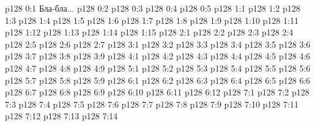 \author{Midwayer Commission}
\vs p128 0:1  Бла-бла...
\vs p128 0:2 
\vs p128 0:3 
\vs p128 0:4 
\vs p128 0:5 \pc 
{}
\vs p128 1:1 
\vs p128 1:2 
\vs p128 1:3 
\vs p128 1:4 
\vs p128 1:5 \pc 
\vs p128 1:6 \pc 
\vs p128 1:7 
\vs p128 1:8 
\vs p128 1:9 
\vs p128 1:10 
\vs p128 1:11 \pc 
\vs p128 1:12 
\vs p128 1:13 
\vs p128 1:14 \pc 
\vs p128 1:15 
\vs p128 2:1 
\vs p128 2:2 
\vs p128 2:3 
\vs p128 2:4 \pc 
\vs p128 2:5 \pc 
\vs p128 2:6 
\vs p128 2:7 
\vs p128 3:1 
\vs p128 3:2 
\vs p128 3:3 
\vs p128 3:4 
\vs p128 3:5 
\vs p128 3:6 
\vs p128 3:7 \pc 
\vs p128 3:8 
\vs p128 3:9 \pc 
{}
\vs p128 4:1 
\vs p128 4:2 
\vs p128 4:3 
\vs p128 4:4 
\vs p128 4:5 \pc 
\vs p128 4:6 
\vs p128 4:7 
\vs p128 4:8 \pc 
\vs p128 4:9 
\vs p128 5:1 
\vs p128 5:2 \pc 
\vs p128 5:3 
\vs p128 5:4 
\vs p128 5:5 
\vs p128 5:6 \pc 
\vs p128 5:7 
\vs p128 5:8 
\vs p128 5:9 \pc 
{}
\vs p128 6:1 
\vs p128 6:2 \pc 
\vs p128 6:3 \pc 
\vs p128 6:4 
\vs p128 6:5 
\vs p128 6:6 
\vs p128 6:7 
\vs p128 6:8 
\vs p128 6:9 
\vs p128 6:10 \pc 
\vs p128 6:11 
\vs p128 6:12 
\vs p128 7:1 
\vs p128 7:2 
\vs p128 7:3 \pc 
\vs p128 7:4 
\vs p128 7:5 
\vs p128 7:6 
\vs p128 7:7 \pc 
\vs p128 7:8 
\vs p128 7:9 \pc 
\vs p128 7:10 \pc 
\vs p128 7:11 
\vs p128 7:12 
\vs p128 7:13 \pc 
\vs p128 7:14 
\quizlink
